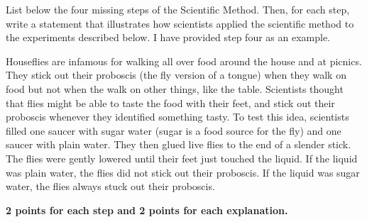 \showpoints
\question[16]
List below the four missing steps of the Scientific Method. Then,
for each step, write a statement that illustrates how scientists applied
the scientific method to the experiments described below. I have
provided step four as an example. 

Houseflies are infamous for walking all over food around the house
and at picnics. They stick out their proboscis (the fly version of a tongue)
when they walk on food but not when the walk on other things, like the table.
Scientists thought that flies might be able to taste the food with their feet,
and stick out their proboscis whenever they identified something tasty. To
test this idea, scientists filled one saucer with sugar water (sugar is a food
source for the fly) and one saucer with plain water. They then glued live 
flies to the end of a slender stick. The flies were gently lowered until their 
feet just touched the liquid. If the liquid was plain water, the flies did not stick
out their proboscis. If the liquid was sugar water, the flies always stuck out 
their proboscis.


	\ifprintanswers\textbf{2 points for each step and 2 points for each explanation.}\fi
\hidepoints